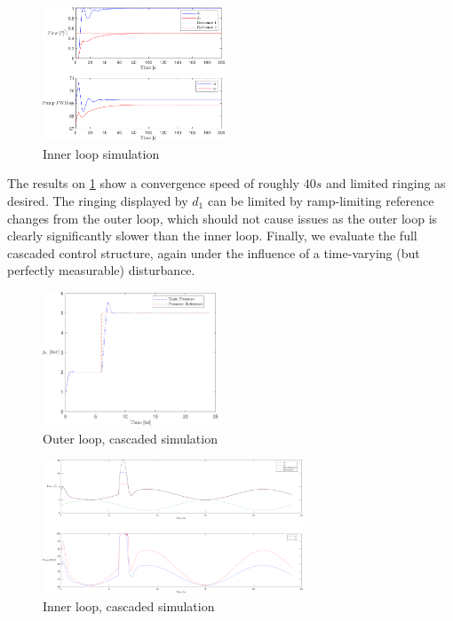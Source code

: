 \begin{figure}[h!]
	\includegraphics[width=\linewidth,height=4cm]{Graphics/PumpSimulation.pdf}
	\caption{Inner loop simulation}
	\label{fig:PumpSimulation}
\end{figure}

The results on \cref{fig:PumpSimulation} show a convergence speed of roughly $40 \si{s}$ and limited ringing as desired. The ringing displayed by $d_1$ can be limited by ramp-limiting reference changes from the outer loop, which should not cause issues as the outer loop is clearly significantly slower than the inner loop. Finally, we evaluate the full cascaded control structure, again under the influence of a time-varying (but perfectly measurable) disturbance.

\begin{figure}[h!]
	\includegraphics[height=4cm, width=\linewidth]{Graphics/FullSimPressures.pdf}
	\caption{Outer loop, cascaded simulation}
	\label{fig:FullSimPressure}
\end{figure}

\begin{figure}[h!]
	\includegraphics[height=4cm, width=\linewidth]{Graphics/FullSimFlows.pdf}
	\caption{Inner loop, cascaded simulation}
	\label{fig:FullSimFlows}
\end{figure}


